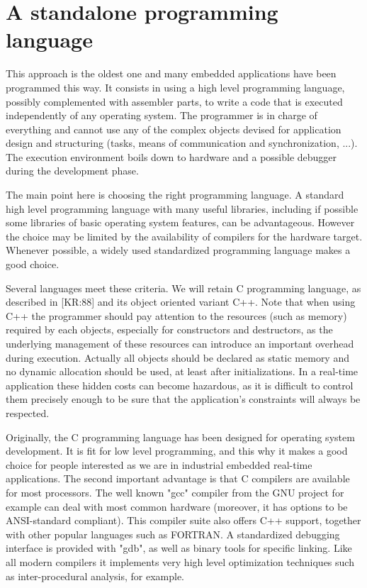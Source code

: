 \documentclass[10pt]{report}
\begin{document}
\section{A standalone programming language}

This approach is the oldest one and many embedded applications
have been programmed this way. It consists in using a high level
programming language, possibly complemented with assembler parts,
to write a code that is executed independently of any operating
system. The programmer is in charge of everything and cannot use
any of the complex objects devised for application design and
structuring (tasks, means of communication and synchronization,
...). The execution environment boils down to hardware and a
possible debugger during the development phase.

The main point here is choosing the right programming language. A
standard high level programming language with many useful
libraries, including if possible some libraries of basic
operating system features, can be advantageous. However the
choice may be limited by the availability of compilers for the
hardware target. Whenever possible, a widely used standardized
programming language makes a good choice.

Several languages meet these criteria. We will retain C
programming language, as described in [KR:88] and its object
oriented variant C++. Note that when using C++ the programmer
should pay attention to the resources (such as memory) required
by each objects, especially for constructors and destructors, as
the underlying management of these resources can introduce an
important overhead during execution. Actually all objects should
be declared as static memory and no dynamic allocation should be
used, at least after initializations. In a real-time application
these hidden costs can become hazardous, as it is difficult to
control them precisely enough to be sure that the application's
constraints will always be respected.

Originally, the C programming language has been designed for
operating system development. It is fit for low level
programming, and this why it makes a good choice for people
interested as we are in industrial embedded real-time
applications. The second important advantage is that C compilers
are available for most processors. The well known "gcc" compiler
from the GNU project for example can deal with most common
hardware (moreover, it has options to be ANSI-standard
compliant). This compiler suite also offers C++ support, together
with other popular languages such as FORTRAN. A standardized
debugging interface is provided with "gdb", as well as binary
tools for specific linking. Like all modern compilers it
implements very high level optimization techniques such as
inter-procedural analysis, for example.
\end{document}
